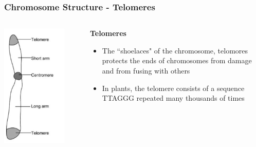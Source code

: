 \documentclass{beamer}
\begin{document}
	
	\begin{frame}
		\frametitle{Chromosome Structure - Telomeres}
		\begin{columns}
			\begin{column}{0.5\textwidth}
				
				\centering	\includegraphics[keepaspectratio, width  =0.8\textwidth]{img/chromosomeDiagram}
			\end{column}
			\begin{column}{0.5\textwidth}
		\textbf{Telomeres}
		\begin{itemize}
		\item The ``shoelaces" of the chromosome, telomores protects the ends of chromosomes from damage and from fusing with others
		\vspace{10pt}
		\item In plants, the telomere consists of a sequence TTAGGG repeated many thousands of times
		\end{itemize}
			\end{column}
			
		\end{columns}
\end{frame}
	
\end{document}

